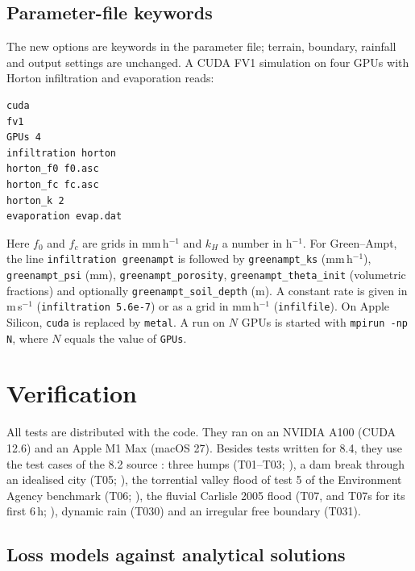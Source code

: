 \documentclass[gmd, manuscript]{copernicus}
\begin{document}
\subsection{Parameter-file keywords}\label{sec:usage}

The new options are keywords in the parameter file; terrain, boundary,
rainfall and output settings are unchanged. A CUDA FV1 simulation on four
GPUs with Horton infiltration and evaporation reads:
\begin{verbatim}
cuda
fv1
GPUs 4
infiltration horton
horton_f0 f0.asc
horton_fc fc.asc
horton_k 2
evaporation evap.dat
\end{verbatim}
Here $f_0$ and $f_c$ are grids in mm\,h$^{-1}$ and $k_H$ a number in
h$^{-1}$. For Green--Ampt, the line \texttt{infiltration greenampt} is
followed by \texttt{greenampt\_ks} (mm\,h$^{-1}$), \texttt{greenampt\_psi}
(mm), \texttt{greenampt\_porosity}, \texttt{greenampt\_theta\_init}
(volumetric fractions) and optionally \texttt{greenampt\_soil\_depth} (m).
A constant rate is given in m\,s$^{-1}$ (\texttt{infiltration 5.6e-7}) or as a
grid in mm\,h$^{-1}$ (\texttt{infilfile}). On Apple Silicon, \texttt{cuda} is
replaced by \texttt{metal}. A run on $N$ GPUs is started with
\texttt{mpirun -np N}, where $N$ equals the value of \texttt{GPUs}.

\section{Verification}\label{sec:verification}

All tests are distributed with the code. They ran on an NVIDIA A100 (CUDA
12.6) and an Apple M1 Max (macOS 27). Besides tests written for 8.4, they use
the test cases of the 8.2 source \citep{LISFLOODFP82zenodo}: three humps
(T01--T03; \citealp{Liang2009,Shirvani2021}), a dam break through an
idealised city (T05; \citealp{SoaresFrazao2008}), the torrential valley flood
of test 5 of the Environment Agency benchmark (T06;
\citealp{NeelzPender2013,Ayog2021}), the fluvial Carlisle 2005 flood (T07, and
T07s for its first 6\,h; \citealp{Horritt2010,Neal2013}),
dynamic rain (T030) and an irregular free boundary (T031).

\subsection{Loss models against analytical solutions}\label{sec:losstests}
\end{document}

